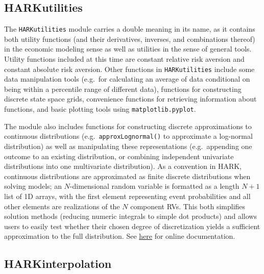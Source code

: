 \documentclass[12pt,titlepage,letterpaper]{econtex}
\begin{document}
\subsection{HARKutilities}\label{sec:HARKutilities}

The \texttt{HARKutilities} module carries a double meaning in its name, as it contains both utility functions (and their derivatives, inverses, and combinations thereof) in the economic modeling sense as well as utilities in the sense of general tools.  Utility functions included at this time are constant relative risk aversion and constant absolute risk aversion.  Other functions in \texttt{HARKutilities} include some data manipulation tools (e.g.\ for calculating an average of data conditional on being within a percentile range of different data), functions for constructing discrete state space grids, convenience functions for retrieving information about functions, and basic plotting tools using \texttt{matplotlib.pyplot}.

The module also includes functions for constructing discrete approximations to continuous distributions (e.g.\ \texttt{approxLognormal()} to approximate a log-normal distribution) as well as manipulating these representations (e.g.\ appending one outcome to an existing distribution, or combining independent univariate distributions into one multivariate distribution).  As a convention in HARK, continuous distributions are approximated as finite discrete distributions when solving models; an $N$-dimensional random variable is formatted as a length $N+1$ list of 1D arrays, with the first element representing event probabilities and all other elements are realizations of the $N$ component RVs.  This both simplifies solution methods (reducing numeric integrals to simple dot products) and allows users to easily test whether their chosen degree of discretization yields a sufficient approximation to the full distribution.  See \href{https://econ-ark.github.io/HARK/generated/HARKutilities.html}{here} for online documentation.

\subsection{HARKinterpolation}\label{sec:HARKinterpolation}
\end{document}
